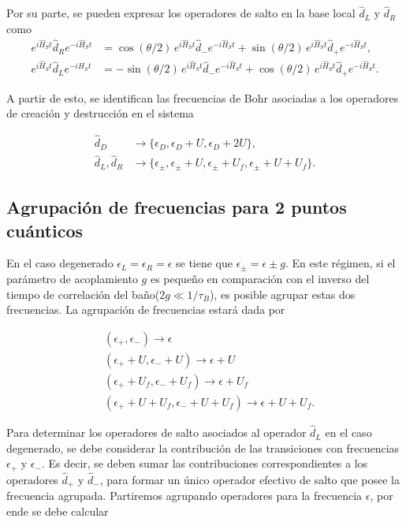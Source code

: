 \begin{appendixs}
Por su parte, se pueden expresar los operadores de salto en la base local $\hat{d}_{L}$ y $\hat{d}_{R}$ como 
\begin{align*}
    e^{i\hat{H}_{S}t}\hat{d}_{R}e^{-i\hat{H}_{S}t} & = \cos(\theta/2)\, e^{i\hat{H}_{S}t}\hat{d}_{-}e^{-i\hat{H}_{S}t} + \sin(\theta/2)\, e^{i\hat{H}_{S}t}\hat{d}_{+}e^{-i\hat{H}_{S}t}, \\
    e^{i\hat{H}_{S}t}\hat{d}_{L}e^{-i\hat{H}_{S}t} & = -\sin(\theta/2)\, e^{i\hat{H}_{S}t}\hat{d}_{-}e^{-i\hat{H}_{S}t} + \cos(\theta/2)\, e^{i\hat{H}_{S}t}\hat{d}_{+}e^{-i\hat{H}_{S}t}.
\end{align*}

A partir de esto, se identifican las frecuencias de Bohr asociadas a los operadores de creación y destrucción en el sistema

\begin{align*}
    \hat{d}_{D} & \rightarrow \{\epsilon_{D}, \epsilon_{D}+U, \epsilon_{D}+2U\}, \\
    \hat{d}_{L}, \hat{d}_{R} & \rightarrow \{\epsilon_{\pm}, \epsilon_{\pm}+U, \epsilon_{\pm}+U_{f}, \epsilon_{\pm}+U+U_{f}\}.
\end{align*}



\label{apendix5jumpop}

\subsection{Agrupación de frecuencias para 2 puntos cuánticos}
En el caso degenerado $\epsilon_{L} = \epsilon_{R}= \epsilon$ se tiene que $\epsilon_{\pm} = \epsilon \pm g$. En este régimen, si el parámetro de acoplamiento $g$ es pequeño en comparación con el inverso del tiempo de correlación del baño($2g\ll 1/\tau_{B}$), es posible agrupar estas dos frecuencias. La agrupación de frecuencias estará dada por 

\begin{align*}
    &(\epsilon_{+},\epsilon_{-})  \to \epsilon \\
    &(\epsilon_{+}+U,\epsilon_{-}+U)  \to \epsilon+U \\
    &(\epsilon_{+}+U_{f},\epsilon_{-}+U_{f})  \to \epsilon+U_{f} \\
    &(\epsilon_{+}+U+U_{f},\epsilon_{-}+U+U_{f})  \to \epsilon+U+U_{f}.
\end{align*}

Para determinar los operadores de salto asociados al operador $\hat{d}_{L}$ en el caso degenerado, se debe considerar la contribución de las transiciones con frecuencias $\epsilon_{+}$ y $\epsilon_{-}$. Es decir, se deben sumar las contribuciones correspondientes a los operadores $\hat{d}_{+}$ y $\hat{d}_{-}$, para formar un único operador efectivo de salto que posee la frecuencia agrupada. Partiremos agrupando operadores para la frecuencia $\epsilon$, por ende se debe calcular 


\end{appendixs}
